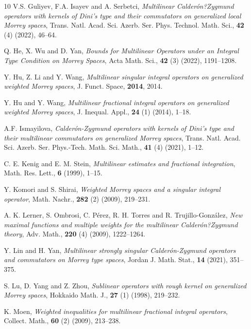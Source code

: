 \documentclass[11pt, twoside, leqno]{article}
\begin{document}
\begin{thebibliography}{10}
	V.S. Guliyev, F.A. Isayev and A. Serbetci, \emph{Multilinear Calder\'{o}n?Zygmund operators with kernels of Dini's type and their commutators on generalized local Morrey spaces}, Trans. Natl. Acad. Sci. Azerb. Ser. Phys. Technol. Math. Sci., \textbf{42} (4) (2022), 46--64.
	
	Q. He, X. Wu and D. Yan, \emph{Bounds for Multilinear Operators under an Integral Type Condition on Morrey Spaces}, Acta Math. Sci., \textbf{42} (3) (2022), 1191--1208.
	
	Y. Hu, Z. Li and Y. Wang, \emph{Multilinear singular integral operators on generalized weighted Morrey spaces}, J. Funct. Space, \textbf{2014}, 2014.
	
	Y. Hu and Y. Wang, \emph{Multilinear fractional integral operators on generalized weighted Morrey spaces}, J. Inequal. Appl., \textbf{24} (1) (2014), 1--18.
	
	A.F. Ismayilova, \emph{Calder\'{o}n-Zygmund operators with kernels of Dini's type and their multilinear commutators on generalized Morrey spaces}, Trans. Natl. Acad. Sci. Azerb. Ser. Phys.-Tech. Math. Sci. Math., \textbf{41} (4) (2021), 1--12.
	
	C. E. Kenig and  E. M. Stein, \emph{Multilinear estimates and fractional integration}, Math. Res. Lett., \textbf{6} (1999), 1--15.
	
	
	Y. Komori and S. Shirai, \emph{Weighted Morrey spaces and a singular integral operator}, Math. Nachr., \textbf{282} (2) (2009), 219--231.
	
	A. K. Lerner, S. Ombrosi, C. P\'{e}rez, R. H. Torres and R. Trujillo-Gonz\'{a}lez, \emph{New maximal functions and multiple weights for the multilinear Calder\'{o}n?Zygmund theory}, Adv. Math., \textbf{220} (4) (2009), 1222--1264.
	
	Y. Lin and H. Yan, \emph{Multilinear strongly singular Calderón-Zygmund operators and commutators on Morrey type spaces}, Jordan J. Math. Stat., \textbf{14} (2021), 351--375.
	
	S. Lu, D. Yang and Z. Zhou, \emph{Sublinear operators with rough kernel on generalized Morrey spaces}, Hokkaido Math. J., \textbf{27} (1) (1998), 219--232.
	
	K. Moen, \emph{Weighted inequalities for multilinear fractional integral operators}, Collect. Math., \textbf{60} (2) (2009), 213--238.
	

\end{thebibliography}
\end{document}
